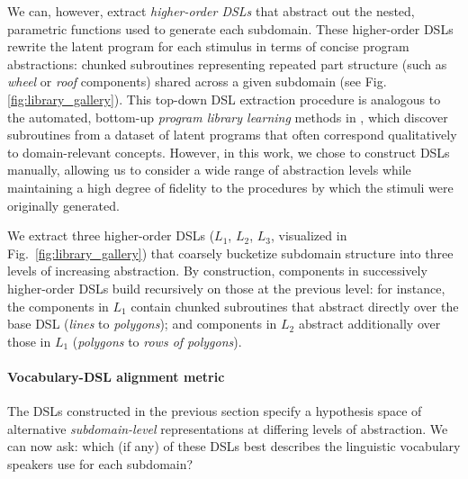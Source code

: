 \documentclass[10pt,letterpaper]{article}
\begin{document}
We can, however, extract \textit{higher-order DSLs} that abstract out the nested, parametric functions used to generate each subdomain. These higher-order DSLs rewrite the latent program for each stimulus in terms of concise program abstractions: chunked subroutines representing repeated part structure (such as \textit{wheel} or \textit{roof} components) shared across a given subdomain
(see Fig. \ref{fig:library_gallery}). This top-down DSL extraction procedure is analogous to the automated, bottom-up \textit{program library learning} methods in , which discover subroutines from a dataset of latent programs that often correspond qualitatively to domain-relevant concepts.
However, in this work, we chose to construct DSLs manually, allowing us to consider a wide range of abstraction levels while maintaining a high degree of fidelity to the procedures by which the stimuli were originally generated.

We extract three higher-order DSLs ($L_1$, $L_2$, $L_3$, visualized in Fig.~\ref{fig:library_gallery}) that coarsely bucketize subdomain structure into three levels of increasing abstraction. By construction, components in successively higher-order DSLs build recursively on those at the previous level: for instance, the components in $L_1$ contain chunked subroutines that abstract directly over the base DSL (\textit{lines} to \textit{polygons}); and components in $L_2$ abstract additionally over those in $L_1$ (\textit{polygons} to \textit{rows of polygons}). 

\paragraph{Vocabulary-DSL alignment metric}
The DSLs constructed in the previous section specify a hypothesis space of alternative \textit{subdomain-level} representations at differing levels of abstraction. We can now ask: which (if any) of these DSLs best describes the linguistic vocabulary speakers use for each subdomain? 

\end{document}
